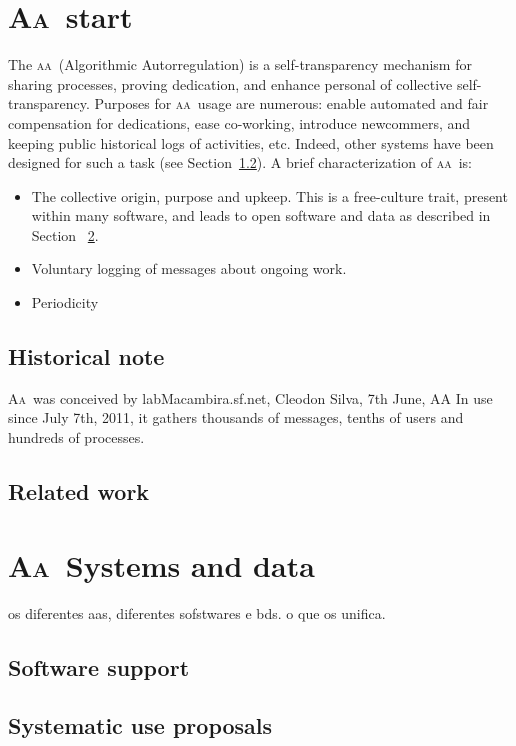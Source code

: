 \documentclass[a4paper, 11pt]{article} %
\newcommand{\aab}{\textsc{aa}}
\newcommand{\aai}{\textsc{Aa}}
\newcommand{\lm}{lab\textsc{M}acambira.sf.net}
\begin{document}
\section{\aai\ start}
The \aab\ (Algorithmic Autorregulation) is a self-transparency mechanism for sharing processes, proving dedication, and enhance personal of collective self-transparency. Purposes for \aab\ usage are numerous: enable automated and fair compensation for dedications, ease co-working, introduce newcommers, and keeping public historical logs of activities, etc. Indeed, other systems have been designed for such a task (see Section~\ref{sec:rel}). A brief characterization of \aab\ is:
\begin{itemize}
    \item The collective origin, purpose and upkeep. This is a free-culture trait, present within many software, and leads to open software and data as described in Section ~\ref{sec:sdata}.
    \item Voluntary logging of messages about ongoing work.
    \item Periodicity
\end{itemize}

\subsection{Historical note}
\aai\ was conceived by \lm, Cleodon Silva, 7th June, AA
 In use since July 7th, 2011, it gathers thousands of messages, tenths of users and hundreds of processes. 
 \subsection{Related work}\label{sec:rel}

 \section{\aai\ Systems and data}\label{sec:sdata}
os diferentes aas, diferentes sofstwares e bds.
o que os unifica.
\subsection{Software support}

\subsection{Systematic use proposals}
\end{document}
